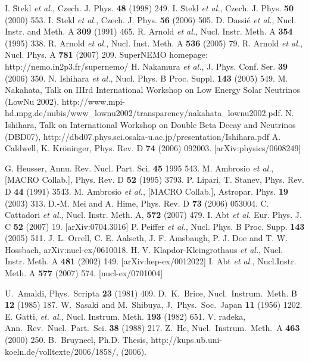 \begin{thebibliography}{99}
I. \u{S}tekl \textit{et al.}, Czech. J. Phys. \textbf{48} (1998) 249.
I. \u{S}tekl \textit{et al.}, Czech. J. Phys. \textbf{50} (2000) 553.
I. \u{S}tekl \textit{et al.}, Czech. J. Phys. \textbf{56} (2006) 505.
D. Dassi\'{e} \textit{et al.}, Nucl. Instr. and Meth. A \textbf{309} (1991) 465.
R. Arnold \textit{et al.}, Nucl. Instr. Meth. A \textbf{354} (1995) 338.
R. Arnold \textit{et al.}, Nucl. Inst. Meth. A \textbf{536} (2005) 79.
R. Arnold \textit{et al.}, Nucl. Phys. A \textbf{781} (2007) 209.
SuperNEMO homepage: http://nemo.in2p3.fr/supernemo/
H. Nakamura \textit{et al.}, J. Phys. Conf. Ser. \textbf{39} (2006) 350.
N. Ishihara \textit{et al.}, Nucl. Phys. B Proc. Suppl. \textbf{143} (2005) 549.
M. Nakahata, Talk on IIIrd International Workshop on Low Energy Solar Neutrinos (LowNu 2002), http://www.mpi-hd.mpg.de/nubis/www\_lownu2002/transparency/nakahata\_lownu2002.pdf. 
N. Ishihara, Talk on International Workshop on Double Beta Decay and Neutrinos (DBD07), http://dbd07.phys.sci.osaka-u.ac.jp/presentation/Ishihara.pdf
A. Caldwell, K. Kr\"oninger, Phys. Rev. D \textbf{74}
(2006) 092003. [arXiv:physics/0608249]

G. Heusser, Annu. Rev. Nucl. Part. Sci. \textbf{45} 1995 543.
M. Ambrosio \textit{et al.}, [MACRO Collab.], Phys. Rev. D \textbf{52} (1995) 3793.
P. Lipari, T. Stanev, Phys. Rev. D \textbf{44} (1991) 3543.
M. Ambrosio \textit{et al.}, [MACRO Collab.], Astropar. Phys. \textbf{19} (2003) 313.
D.-M. Mei and A. Hime, Phys. Rev. D \textbf{73} (2006) 053004.
C. Cattadori \textit{et al.}, Nucl. Instr. Meth. A, \textbf{572} (2007) 479.
I. Abt \textit{et al.}  Eur. Phys. J. C \textbf{52}   (2007) 19. [arXiv:0704.3016]
P. Peiffer \textit{et al.}, Nucl. Phys. B   Proc. Supp. \textbf{143} (2005) 511.
J. L. Orrell, C. E. Aalseth, J. F. Amsbaugh, P. J. Doe   and T. W. Hossbach, arXiv:nucl-ex/0610018.
H. V. Klapdor-Kleingrothaus \textit{et al.},   Nucl. Instr. Meth. A \textbf{481} (2002) 149. [arXiv:hep-ex/0012022]
I. Abt \textit{et al.}, Nucl.Instr. Meth. A \textbf{577} (2007) 574. [nucl-ex/0701004]

U.~Amaldi, Phys.~Scripta \textbf{23} (1981) 409.
D.~K.~Brice, Nucl.~Instrum.~Meth. B \textbf{12} (1985) 187.
 W.~Sasaki and M.~Shibuya, J.~Phys.~Soc.~Japan   \textbf{11} (1956) 1202.
E. Gatti, \textit{et. al.}, Nucl. Instrum. Meth.   \textbf{193} (1982) 651.
 V. radeka, Ann.~Rev.~Nucl.~Part.~Sci. \textbf{38}
  (1988) 217.
 Z.~He, Nucl.~Instrum.~Meth.~A \textbf{463} (2000) 250.
B.~Bruyneel, Ph.D. Thesis, http://kups.ub.uni-koeln.de/volltexte/2006/1858/, (2006).
\end{thebibliography}


